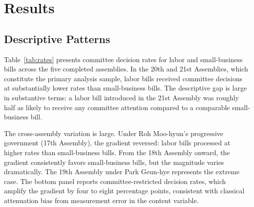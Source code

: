 \documentclass[11pt]{article}
\begin{document}

\section{Results}
\label{sec:results}

\subsection{Descriptive Patterns}
\label{sec:results-desc}

Table~\ref{tab:rates} presents committee decision rates for labor and small-business bills across the five completed assemblies. In the 20th and 21st Assemblies, which constitute the primary analysis sample, labor bills received committee decisions at substantially lower rates than small-business bills. The descriptive gap is large in substantive terms: a labor bill introduced in the 21st Assembly was roughly half as likely to receive any committee attention compared to a comparable small-business bill.

The cross-assembly variation is large. Under Roh Moo-hyun's progressive government (17th Assembly), the gradient reversed: labor bills processed at higher rates than small-business bills. From the 18th Assembly onward, the gradient consistently favors small-business bills, but the magnitude varies dramatically. The 19th Assembly under Park Geun-hye represents the extreme case. The bottom panel reports committee-restricted decision rates, which amplify the gradient by four to eight percentage points, consistent with classical attenuation bias from measurement error in the content variable.
\end{document}

